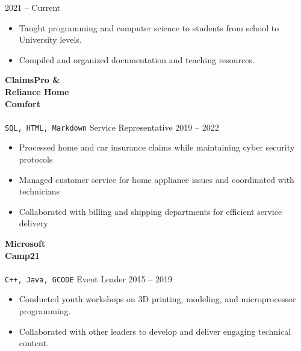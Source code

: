 \documentclass[9pt]{src/developercv} %
\begin{document}
\begin{entrylist}
			{2021 -- Current}
			{
				\vspace{-1.0\baselineskip}%
				\begin{itemize}
					\item Taught programming and computer science to students from school to University levels.
					\item Compiled and organized documentation and teaching resources.
				\end{itemize}
				}
			\entry
				{\textbf{ClaimsPro \&\\Reliance Home\\Comfort}\\\\\small{\texttt{SQL, HTML, Markdown}}}
				{Service Representative}
				{2019 -- 2022}
				{
					\vspace{-1.0\baselineskip}
					\begin{itemize}
						\item Processed home and car insurance claims while maintaining cyber security protocols
						\item Managed customer service for home appliance issues and coordinated with technicians
						\item Collaborated with billing and shipping departments for efficient service delivery
					\end{itemize}
				}
		\entry
			{\textbf{Microsoft\\Camp21}\\\\\small{\texttt{C++, Java, GCODE}}}
			{Event Leader}
			{2015 -- 2019}
			{
				\vspace{-1.0\baselineskip}%
				\begin{itemize}
					\item Conducted youth workshops on 3D printing, modeling, and microprocessor programming.
					\item Collaborated with other leaders to develop and deliver engaging technical content.
				\end{itemize}
			}
	\end{entrylist}
\end{document}
